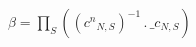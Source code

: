 \documentclass[border=1pt]{standalone}
\begin{document}
$\beta=\prod_{S}  {\left(\left( {c^n}{_{N, S}} \right)^{-1} \, . \, {{\_c}}{_{N, S}}\right)} $
\end{document}
